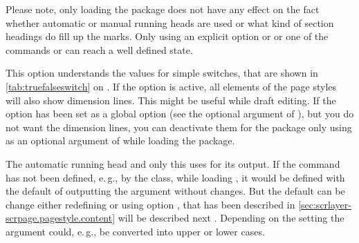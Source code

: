 Please note, only loading the package does not have
any effect on the fact whether automatic or manual running heads are used or
what kind of section headings do fill up the marks. Only using an explicit
option  or  or one of the commands
 or  can reach a well defined state.%
\EndIndexGroup
\fi %

\ifshortversion\IgnoreThistrue{}\fi
\ifIgnoreThis %
\else %

\begin{Declaration}
\end{Declaration}
This \KOMAScript{} option understands the values for simple switches, that are
shown in \autoref{tab:truefalseswitch} on . If
the option is active, all elements of the page styles will also show dimension
lines. This might be useful while draft editing. If the option has been set as
a global option (see the optional argument of ), but you
do not want the dimension lines, you can deactivate them for the package only
using  as an optional argument of 
while loading the package.%
\EndIndexGroup

\begin{Declaration}
\end{Declaration}
The automatic running head and only this uses  for its
output. If the command has not been defined, e.\,g., by the class, while
loading , it would be defined with the default of outputting
the argument  without changes. But the default can be change
either redefining  or using option , that
\ifshortversion has been described in
\autoref{sec:scrlayer-scrpage.pagestyle.content}%
\else will be described next%
\fi%
. Depending on the setting the argument could, e.\,g., be converted into upper
or lower cases.
%
\EndIndexGroup
\fi %


